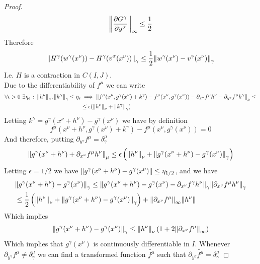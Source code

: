 \documentclass[../complete.tex]{subfiles}
\begin{document}
\begin{proof}
	\begin{equation*}
		\norm{\pdv{G^\gamma}{y^\sigma}}_\infty\le\frac{1}{2}
	\end{equation*}
	Therefore
	\begin{equation*}
		\norm{H^\gamma(w^\gamma(x^\nu))-H^\gamma(v^\sigma(x^\nu))}_\gamma\le\frac{1}{2}\norm{w^\gamma(x^\nu)-v^\gamma(x^\nu)}_\gamma
	\end{equation*}
	I.e. $H$ is a contraction in $C(I,J)$.\\
	Due to the differentiability of $f^\mu$ we can write
	\begin{equation*}
		\begin{aligned}
			\forall\epsilon>0\ \exists\eta_\epsilon\st\norm{h^\nu}_\nu,\norm{k^\gamma}_\gamma\le\eta_\epsilon&\implies{}\norm{f^\mu(x^\nu,g^\gamma(x^\nu)+k^\gamma)-f^\mu(x^\nu,g^\gamma(x^\nu))-\partial_{x^\nu}f^\mu h^\nu-\partial_{y^\gamma}f^\mu k^\gamma}_\mu\le\\
			&\le\epsilon(\norm{h^\nu}_\nu+\norm{k^\gamma}_\gamma)
		\end{aligned}
	\end{equation*}
	Letting $k^\gamma=g^\gamma(x^\nu+h^\nu)-g^\gamma(x^\nu)$ we have by definition
	\begin{equation*}
		f^\mu(x^\nu+h^\nu,g^\gamma(x^\nu)+k^\gamma)-f^\mu(x^\nu,g^\gamma(x^\nu))=0
	\end{equation*}
	And therefore, putting $\partial_{y^\gamma}f^\mu=\delta^\mu_\gamma$
	\begin{equation*}
		\norm{g^\gamma(x^\nu+h^\nu)+\partial_{x^\nu}f^\mu h^\nu}_\mu\le\epsilon\left( \norm{h^\nu}_\nu+\norm{g^\gamma(x^\nu+h^\nu)-g^\gamma(x^\nu)}_\gamma \right)
	\end{equation*}
	Letting $\epsilon=1/2$ we have $\norm{g^\gamma(x^\nu+h^\nu)-g^\gamma(x^\nu)}\le\eta_{1/2}$, and we have
	\begin{equation*}
		\begin{aligned}
			&\norm{g^\gamma(x^\nu+h^\nu)-g^\gamma(x^\nu)}_\gamma\le\norm{g^\gamma(x^\nu+h^\nu)-g^\gamma(x^\nu)-\partial_{x^\nu}f^\gamma h^\nu}_\gamma\norm{\partial_{x^\nu}f^\mu h^\nu}_\gamma\\
			&\le\frac{1}{2}\left( \norm{h^\nu}_\nu+\norm{g^\gamma(x^\nu+h^\nu)-g^\gamma(x^\nu)}_\gamma \right)+\norm{\partial_{x^\nu}f^\mu}_\infty\norm{h^\nu}
		\end{aligned}
	\end{equation*}
	Which implies
	\begin{equation*}
		\norm{g^\gamma(x^\nu+h^\nu)-g^\gamma(x^\nu)}_\gamma\le\norm{h^\nu}_\nu\left( 1+2\norm{\partial_{x^\nu}f^\mu}_\infty \right)
	\end{equation*}
	Which implies that $g^\gamma(x^\nu)$ is continuously differentiable in $I$. Whenever $\partial_{y^\gamma}f^\mu\ne\delta^\mu_\gamma$ we can find a transformed function $\tilde{f^\mu}$ such that $\partial_{y^\gamma}\tilde{f^\mu}=\delta^\mu_\gamma$
\end{proof}
\end{document}
